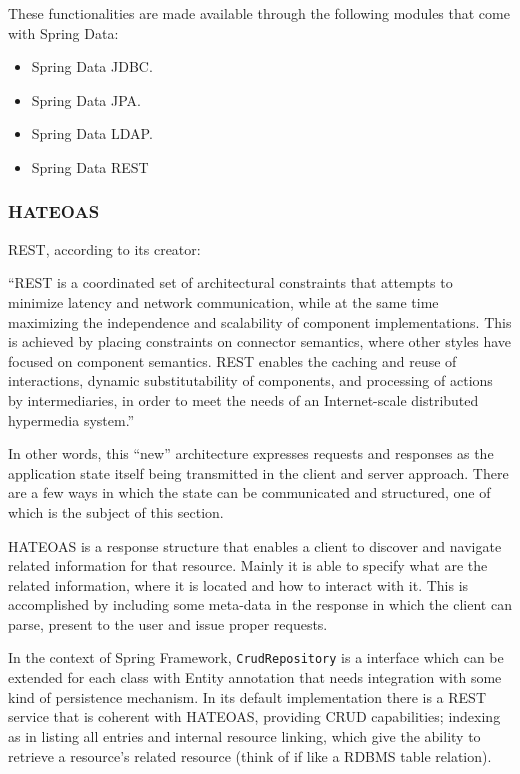 

These functionalities are made available through the following modules that come with Spring Data:
\begin{itemize}
\item Spring Data \gls{JDBC}.
\item Spring Data \gls{JPA}.
\item Spring Data \gls{LDAP}.
\item Spring Data \gls{REST}
\end{itemize}

\subsubsection{\gls{HATEOAS}}
\gls{REST}, according to its creator:
\begin{displayquote}
  ``REST is a coordinated set of architectural constraints that attempts to minimize latency and network communication, while at the same time maximizing the independence and scalability of component implementations. This is achieved  by  placing  constraints  on  connector  semantics,  where  other  styles have focused on component semantics. REST enables the caching and reuse of interactions, dynamic substitutability of components, and processing of actions by intermediaries, in order to meet the needs of an Internet-scale distributed hypermedia system.''~\cite{fielding}
\end{displayquote}

In other words, this ``new'' architecture expresses requests and responses as the application state itself being transmitted in the client and server approach. There are a few ways in which the state can be communicated and structured, one of which is the subject of this section. 

\gls{HATEOAS} is a response structure that enables a client to discover and navigate related information for that resource\cite{fielding}. Mainly it is able to specify what are the related information, where it is located and how to interact with it. This is accomplished by including some meta-data in the response in which the client can parse, present to the user and issue proper requests.

In the context of Spring Framework, \texttt{CrudRepository} is a interface which can be extended for each class with Entity annotation that needs integration with some kind of persistence mechanism. In its default implementation there is a \gls{REST} service that is coherent with \gls{HATEOAS}, providing \gls{CRUD} capabilities; indexing as in listing all entries and internal resource linking, which give the ability to retrieve a resource's related resource (think of if like a \gls{RDBMS} table relation).

